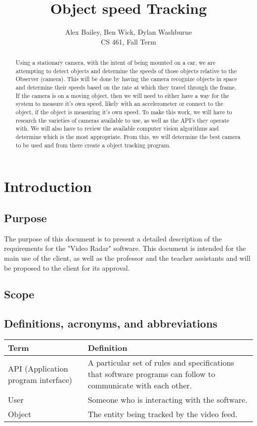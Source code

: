 \documentclass[letterpaper,10pt,onecolumn,draftclsnofoot]{IEEEtran}
\title{Object speed Tracking}
\author{Alex Bailey, Ben Wick, Dylan Washburne\\CS 461, Fall Term}
\begin{document}
\begin{titlepage}

\maketitle

\begin{abstract}
Using a stationary camera, with the intent of being mounted on a car, we are attempting to  detect objects and determine the speeds of those objects relative to the Observer (camera).
This will be done by having the camera recognize objects in space and determine their speeds based on the rate at which they travel through the frame.
If the camera is on a moving object, then we will need to either have a way for the system to measure it's own speed, likely with an accelerometer or connect to the object, if the object is measuring it's own speed.
To make this work, we will have to research the varieties of cameras available to use, as well as the API’s  they operate with.
We will also have to review the available computer vision algorithms and determine which is the most appropriate.
From this, we will determine the best camera to be used and from there create a object tracking program.
 
\end{abstract}

\end{titlepage}


\section{Introduction}
\subsection{Purpose}
The purpose of this document is to present a detailed description of the requirements for the "Video Radar" software.
This document is intended for the main use of the client, as well as the professor and the teacher assistants and will be proposed to the client for its approval.

\subsection{Scope}

\subsection{Definitions, acronyms, and abbreviations}
\begin{tabular}{|p{4cm}|p{12cm}|}
	\hline
	\textbf{Term} & \textbf{Definition} \\
	\hline
	API (Application program interface) & A particular set of rules and specifications that software programs can follow to communicate with each other. \\
	\hline
	User & Someone who is interacting with the software. \\
	\hline
	Object & The entity being tracked by the video feed.  \\
	\hline
	
\end{tabular}
\end{document}
